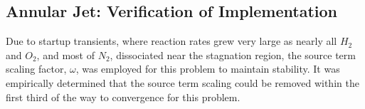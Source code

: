 \subsection{Annular Jet: Verification of Implementation}

Due to startup transients, where reaction rates grew very large as nearly all
$H_2$ and $O_2$, and most of $N_2$, dissociated near the stagnation region, the
source term scaling factor, $\omega$, was employed for this problem to maintain
stability.  It was empirically determined that the source term scaling could be
removed within the first third of the way to convergence for this problem.


